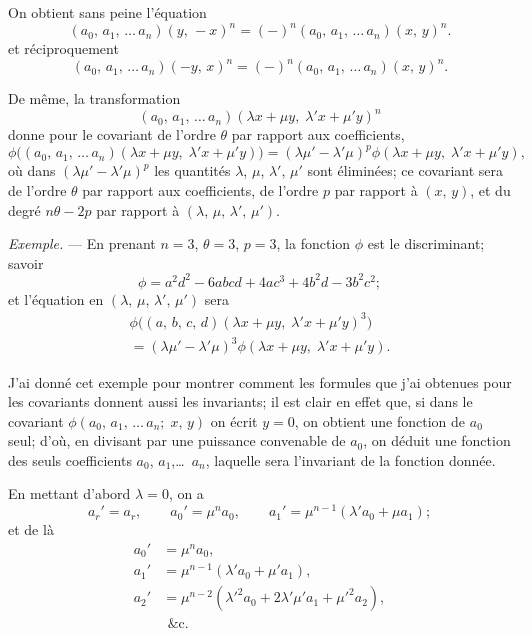 \documentclass[11pt,a4paper]{book}
\begin{document}
\medskip

On obtient sans peine l'\'equation
\[
(a_0,\, a_1,\, \ldots\, a_n)(y,\, -x)^n
= (-)^n (a_0,\, a_1,\, \ldots\, a_n)(x,\, y)^n.
\]
et r\'eciproquement
\[
(a_0,\, a_1,\, \ldots\, a_n)(-y,\, x)^n
= (-)^n (a_0,\, a_1,\, \ldots\, a_n)(x,\, y)^n.
\]

De m\^eme, la transformation
\[
(a_0,\, a_1,\, \ldots\, a_n)(\lambda x + \mu y,\; \lambda' x + \mu' y)^n
\]
donne pour le covariant de l'ordre $\theta$ par rapport aux coefficients,
\[
\phi\bigl((a_0,\, a_1,\, \ldots\, a_n)(\lambda x + \mu y,\;
\lambda' x + \mu' y)\bigr)
= (\lambda\mu' - \lambda'\mu)^p \phi(\lambda x + \mu y,\; \lambda' x + \mu' y),
\]
o\`u dans $(\lambda\mu' - \lambda'\mu)^p$ les quantit\'es $\lambda$, $\mu$,
$\lambda'$, $\mu'$ sont \'elimin\'ees; ce covariant sera de l'ordre $\theta$
par rapport aux coefficients, de l'ordre $p$ par rapport \`a $(x,\, y)$,
et du degr\'e $n\theta - 2p$ par rapport \`a $(\lambda,\, \mu,\, \lambda',\, \mu')$.

\medskip

\textsl{Exemple.} --- En prenant $n=3$, $\theta=3$, $p=3$, la fonction $\phi$
est le discriminant; savoir
\[
\phi = a^2d^2 - 6abcd + 4ac^3 + 4b^2d - 3b^2c^2;
\]
et l'\'equation en $(\lambda,\, \mu,\, \lambda',\, \mu')$ sera
\begin{multline*}
\phi\bigl((a,\, b,\, c,\, d)(\lambda x + \mu y,\;
\lambda' x + \mu' y)^3\bigr) \\
= (\lambda\mu' - \lambda'\mu)^3 \phi(\lambda x + \mu y,\;
\lambda' x + \mu' y).
\end{multline*}

\medskip

J'ai donn\'e cet exemple pour montrer comment les formules que j'ai
obtenues pour les covariants donnent aussi les invariants; il est clair en
effet que, si dans le covariant $\phi(a_0,\, a_1,\, \ldots\, a_n;\; x,\, y)$
on \'ecrit $y=0$, on obtient une fonction de $a_0$ seul; d'o\`u, en divisant
par une puissance convenable de $a_0$, on d\'eduit une fonction des seuls
coefficients $a_0$, $a_1$,\ldots\ $a_n$, laquelle sera l'invariant de la
fonction donn\'ee.

\medskip

En mettant d'abord $\lambda=0$, on a
\[
a_r' = a_r,\qquad a_0' = \mu^n a_0,\qquad a_1' = \mu^{n-1}(\lambda' a_0 + \mu a_1);
\]
et de l\`a
\begin{align*}
a_0' &= \mu^n a_0, \\
a_1' &= \mu^{n-1}(\lambda' a_0 + \mu' a_1), \\
a_2' &= \mu^{n-2}(\lambda'^2 a_0 + 2\lambda'\mu' a_1 + \mu'^2 a_2), \\
& \ \,\text{\&c.}
\end{align*}
\end{document}
